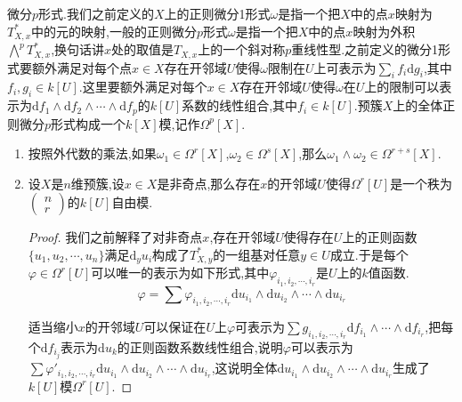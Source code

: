 微分$p$形式.我们之前定义的$X$上的正则微分1形式$\omega$是指一个把$X$中的点$x$映射为$T_{X,x}^*$中的元的映射,一般的正则微分$p$形式$\omega$是指一个把$X$中的点$x$映射为外积$\bigwedge^pT_{X,x}^*$,换句话讲$x$处的取值是$T_{X,x}$上的一个斜对称$p$重线性型.之前定义的微分1形式要额外满足对每个点$x\in X$存在开邻域$U$使得$\omega$限制在$U$上可表示为$\sum_if_i\mathrm{d}g_i$,其中$f_i,g_i\in k[U]$.这里要额外满足对每个$x\in X$存在开邻域$U$使得$\omega$在$U$上的限制可以表示为$\mathrm{d}f_1\wedge\mathrm{d}f_2\wedge\cdots\wedge\mathrm{d}f_p$的$k[U]$系数的线性组合,其中$f_i\in k[U]$.预簇$X$上的全体正则微分$p$形式构成一个$k[X]$模,记作$\Omega^p[X]$.
\begin{enumerate}
	\item 按照外代数的乘法,如果$\omega_1\in\Omega^r[X]$,$\omega_2\in\Omega^s[X]$,那么$\omega_1\wedge\omega_2\in\Omega^{r+s}[X]$.
	\item 设$X$是$n$维预簇,设$x\in X$是非奇点,那么存在$x$的开邻域$U$使得$\Omega^r[U]$是一个秩为$\left(\begin{array}{c}n\\r\end{array}\right)$的$k[U]$自由模.
	\begin{proof}
		
		我们之前解释了对非奇点$x$,存在开邻域$U$使得存在$U$上的正则函数$\{u_1,u_2,\cdots,u_n\}$满足$\mathrm{d}_yu_i$构成了$T_{X,y}^*$的一组基对任意$y\in U$成立.于是每个$\varphi\in\Omega^r[U]$可以唯一的表示为如下形式,其中$\varphi_{i_1,i_2,\cdots,i_r}$是$U$上的$k$值函数.
		$$\varphi=\sum\varphi_{i_1,i_2,\cdots,i_r}\mathrm{d}u_{i_1}\wedge\mathrm{d}u_{i_2}\wedge\cdots\wedge\mathrm{d}u_{i_r}$$
		
		适当缩小$x$的开邻域$U$可以保证在$U$上$\varphi$可表示为$\sum g_{i_1,i_2,\cdots,i_r}\mathrm{d}f_{i_1}\wedge\cdots\wedge\mathrm{d}f_{i_r}$,把每个$\mathrm{d}f_{i_j}$表示为$\mathrm{d}u_k$的正则函数系数线性组合,说明$\varphi$可以表示为$\sum\varphi'_{i_1,i_2,\cdots,i_r}\mathrm{d}u_{i_1}\wedge\mathrm{d}u_{i_2}\wedge\cdots\wedge\mathrm{d}u_{i_r}$,这说明全体$\mathrm{d}u_{i_1}\wedge\mathrm{d}u_{i_2}\wedge\cdots\wedge\mathrm{d}u_{i_r}$生成了$k[U]$模$\Omega^r[U]$.
		

\end{proof}
\end{enumerate}
